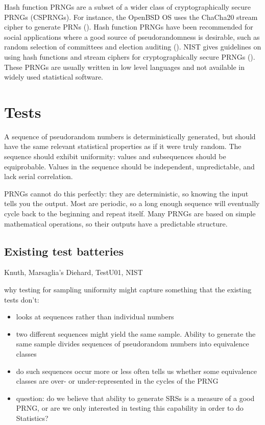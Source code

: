 \documentclass[12pt]{article}
\newcommand{\todo}[1]{{\color{red}{TO DO: \sc #1}}}
\begin{document}
Hash function PRNGs are a subset of a wider class of cryptographically secure PRNGs (CSPRNGs).
For instance, the OpenBSD OS uses the ChaCha20 stream cipher to generate PRNs (\cite{openbsd_arc4random_2014, chacha_bernstein_208}).
Hash function PRNGs have been recommended for social applications where a good source of pseudorandomness is desirable, such as random selection of committees and election auditing (\cite{publicly_motorola_2004, rivest_reference_2011}).
NIST gives guidelines on using hash functions and stream ciphers for cryptographically secure PRNGs (\cite{barker_nist_2015}).
These PRNGs are usually written in low level languages and not available in widely used statistical software.




\todo{state space problem: use CSPRNG in counter mode}






\section{Tests}
A sequence of pseudorandom numbers is deterministically generated, but should have the same relevant statistical properties as if it were truly random.
The sequence should exhibit uniformity: values and subsequences should be equiprobable.
Values in the sequence should be independent, unpredictable, and lack serial correlation.

PRNGs cannot do this perfectly:
they are deterministic, so knowing the input tells you the output.
Most are periodic, so a long enough sequence will eventually cycle back to the beginning and repeat itself.
Many PRNGs are based on simple mathematical operations, so their outputs have a predictable structure.



\subsection{Existing test batteries}
Knuth, Marsaglia's Diehard, TestU01, NIST


why testing for sampling uniformity might capture something that the existing tests don't: 
\begin{itemize}
\item looks at sequences rather than individual numbers
\item two different sequences might yield the same sample. Ability to generate the same sample divides sequences of pseudorandom numbers into equivalence classes
\item do such sequences occur more or less often tells us whether some equivalence classes are over- or under-represented in the cycles of the PRNG
\item question: do we believe that ability to generate SRSs is a measure of a good PRNG, or are we only interested in testing this capability in order to do Statistics?
\end{itemize}
\end{document}
